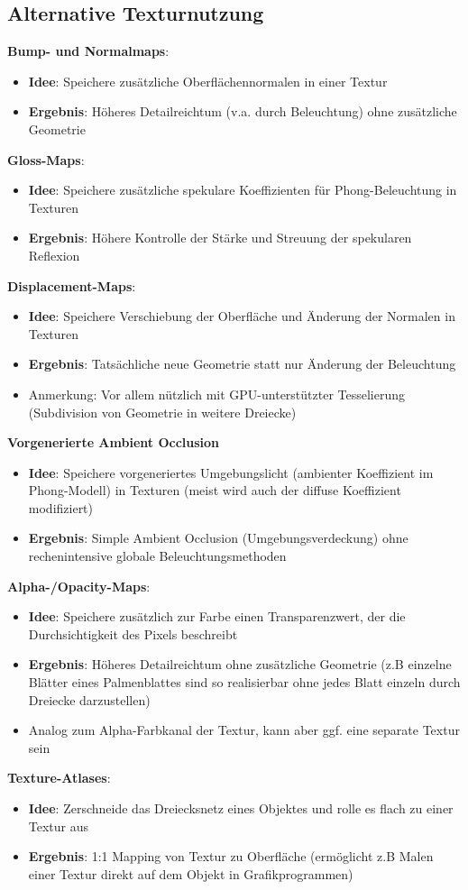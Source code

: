 \subsection{Alternative Texturnutzung}%
\label{tex:sub:alternative_texturnutzung}

\textbf{Bump- und Normalmaps}:
\begin{itemize}
	\item \textbf{Idee}: Speichere zusätzliche Oberflächennormalen in einer Textur
	\item \textbf{Ergebnis}: Höheres Detailreichtum (v.a. durch Beleuchtung) ohne zusätzliche Geometrie
\end{itemize}
\textbf{Gloss-Maps}:
\begin{itemize}
	\item \textbf{Idee}: Speichere zusätzliche spekulare Koeffizienten für Phong-Beleuchtung in Texturen
	\item \textbf{Ergebnis}: Höhere Kontrolle der Stärke und Streuung der spekularen Reflexion
\end{itemize}
\textbf{Displacement-Maps}:
\begin{itemize}
	\item \textbf{Idee}: Speichere Verschiebung der Oberfläche und Änderung der Normalen in Texturen
	\item \textbf{Ergebnis}: Tatsächliche neue Geometrie statt nur Änderung der Beleuchtung
	\item Anmerkung: Vor allem nützlich mit GPU-unterstützter Tesselierung (Subdivision von Geometrie in weitere Dreiecke)
\end{itemize}
\textbf{Vorgenerierte Ambient Occlusion}
\begin{itemize}
	\item \textbf{Idee}: Speichere vorgeneriertes Umgebungslicht (ambienter Koeffizient im Phong-Modell) in Texturen (meist wird auch der diffuse Koeffizient modifiziert)
	\item \textbf{Ergebnis}: Simple Ambient Occlusion (Umgebungsverdeckung) ohne rechenintensive globale Beleuchtungsmethoden
\end{itemize}
\newpage
\textbf{Alpha-/Opacity-Maps}:
\begin{itemize}
	\item \textbf{Idee}: Speichere zusätzlich zur Farbe einen Transparenzwert, der die Durchsichtigkeit des Pixels beschreibt
	\item \textbf{Ergebnis}: Höheres Detailreichtum ohne zusätzliche Geometrie (z.B einzelne Blätter eines Palmenblattes sind so realisierbar ohne jedes Blatt einzeln durch Dreiecke darzustellen)
	\item Analog zum Alpha-Farbkanal der Textur, kann aber ggf. eine separate Textur sein
\end{itemize}
\textbf{Texture-Atlases}:
\begin{itemize}
	\item \textbf{Idee}: Zerschneide das Dreiecksnetz eines Objektes und rolle es flach zu einer Textur aus
	\item \textbf{Ergebnis}: 1:1 Mapping von Textur zu Oberfläche (ermöglicht z.B Malen einer Textur direkt auf dem Objekt in Grafikprogrammen)
\end{itemize}


